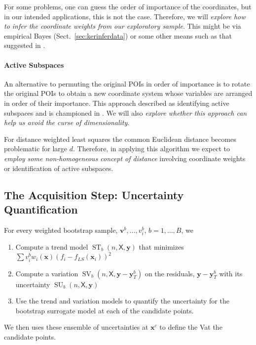 \documentclass[11pt]{NSFamsart}
\DeclareMathOperator{\STREND}{ST} %
\DeclareMathOperator{\SVAR}{SV} %
\DeclareMathOperator{\SURRERR}{SU}
\newcommand{\VAR}{\textup{V}}
\newcommand{\mX}{\mathsf{X}}
\newcommand{\bx}{{\boldsymbol{x}}}
\newcommand{\bv}{{\boldsymbol{v}}}
\newcommand{\by}{{\boldsymbol{y}}}
\begin{document}
For some problems, one can guess the order of importance of the coordinates, but in our intended applications, this is not the case.  Therefore, we will \emph{explore how to infer the coordinate weights from our exploratory sample}.  This might be via empirical Bayes (Sect.\ \ref{sec:kerinferdata}) or some other means such as that suggested in \cite{DinHic20a}.

\paragraph*{Active Subspaces}
An alternative to permuting the original POIs in order of importance is to rotate the original POIs to obtain a new coordinate system whose variables are arranged in order of their importance.  This approach described as identifying active subspaces and is championed in \cite{constantine2015active}.  We will also \emph{explore whether this approach can help us avoid the curse of dimensionality}.

For distance weighted least squares the common Euclidean distance becomes problematic for large $d$.  Therefore, in applying this algorithm we expect to \emph{employ some non-homogeneous concept of distance} involving coordinate weights or identification of active subspaces.


\subsection{The Acquisition Step:  Uncertainty Quantification}


For every weighted bootstrap sample, $\bv^b, \ldots, v_i^b$, $b = 1, \ldots, B$, we 
\begin{enumerate}
\item Compute a trend model $\STREND_b(n,\mX,\by)$ that minimizes $\sum v^b_iw_i(\bx)(f_i - f_{LS}(\bx_i))^2$ 
\item Compute a variation $\SVAR_b(n,\mX,\by - \by_T^b)$ on the residuals, $\by - \by_T^b$ with its uncertainty $\SURRERR_b(n,\mX,\by)$
\item Use the trend and variation models to quantify the uncertainty for the bootstrap surrogate model at each of the candidate points. 
\end{enumerate}
We then uses these ensemble of uncertainties  at $\bx^c$ to define the \VAR at the candidate points. 
\end{document}
